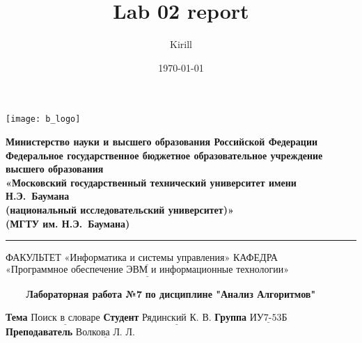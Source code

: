 

\title{Lab 02 report}
\author{Kirill}

\date{\today}


\thispagestyle{empty}

\noindent \begin{minipage}{0.15\textwidth}
    \texttt{[image: b\_logo]}
\end{minipage}
\noindent\begin{minipage}{0.85\textwidth}\centering
    \textbf{Министерство науки и высшего образования Российской Федерации}\\
    \textbf{Федеральное государственное бюджетное образовательное учреждение высшего образования}\\
    \textbf{«Московский государственный технический университет имени Н.Э.~Баумана}\\
    \textbf{(национальный исследовательский университет)»}\\
    \textbf{(МГТУ им. Н.Э.~Баумана)}
\end{minipage}

\noindent\rule{16cm}{3pt}
\newline\newline
\noindent ФАКУЛЬТЕТ $\underline{\text{«Информатика и системы управления»}}$ \newline\newline
\noindent КАФЕДРА $\underline{\text{«Программное обеспечение ЭВМ и информационные технологии»}}$\newline


\begin{center}
    \noindent\begin{minipage}{1.3\textwidth}\centering
    \Large\textbf{   ~~~ Лабораторная работа №7}\newline
    \textbf{по дисциплине "Анализ Алгоритмов"}\newline\newline\newline
    \end{minipage}
\end{center}

\noindent\textbf{Тема} $\underline{\text{Поиск в словаре}}$\newline\newline
\noindent\textbf{Студент} $\underline{\text{Рядинский К. В.}}$\newline\newline
\noindent\textbf{Группа} $\underline{\text{ИУ7-53Б}}$\newline\newline
\noindent\textbf{Преподаватель} $\underline{\text{Волкова Л. Л.}}$\newline

